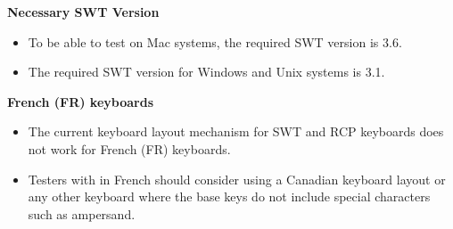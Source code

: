 
\textbf{Necessary SWT Version}\\
\begin{itemize}
\item To be able to test \gdauts{} on Mac systems, the required SWT version is 3.6. 
\item The required SWT version for Windows and Unix systems is 3.1.
\end{itemize}


\textbf{French (FR) keyboards}\\
\begin{itemize}
\item The current keyboard layout mechanism for SWT and RCP keyboards does not work for French (FR) keyboards.
\item Testers with \gdauts{} in French should consider using a Canadian keyboard layout or any other keyboard where the 
base keys do not include special characters such as ampersand.
\end{itemize}
